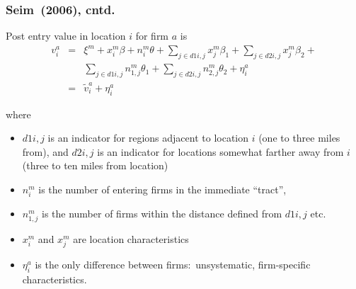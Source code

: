 \documentclass[notes=show]{beamer}
\begin{document}
\begin{frame}%

\frametitle{Seim\ (2006), cntd.}

Post entry value in location $i$ for firm $a$ is 
\begin{eqnarray*}
v_{i}^{a} &=&\xi ^{m}+x_{i}^{m}\beta +n_{i}^{m}\theta +\sum_{j\in
d1i,j}x_{j}^{m}\beta _{1}+\sum_{j\in d2i,j}x_{j}^{m}\beta _{2}+ \\
&&\sum_{j\in d1i,j}n_{1,j}^{m}\theta _{1}+\sum_{j\in d2i,j}n_{2,j}^{m}\theta
_{2}+\eta _{i}^{a} \\
&=&\tilde{v}_{i}^{a}+\eta _{i}^{a}
\end{eqnarray*}

where

\begin{itemize}
\item $d1i,j$ is an indicator for regions adjacent to location $i$ (one to
three miles from), and $d2i,j$ is an indicator for locations somewhat
farther away from $i$ (three to ten miles from location)

\item $n_{i}^{m}$ is the number of entering firms in the immediate
\textquotedblleft tract\textquotedblright ,

\item $n_{1,j}^{m}$ is the number of firms within the distance defined from $%
d1i,j$ etc.

\item $x_{i}^{m}$ and $x_{j}^{m}$ are location characteristics

\item $\eta _{i}^{a}$ is the only difference between firms:\ unsystematic,
firm-specific characteristics.
\end{itemize}

\end{frame}%
\end{document}
